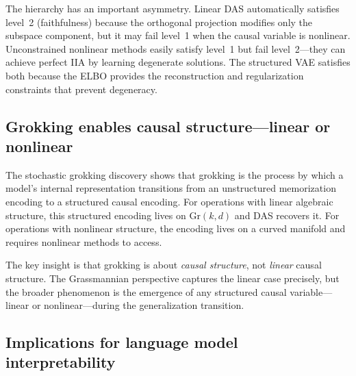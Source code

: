 \documentclass{article}
\newcommand{\Gr}{\mathrm{Gr}}
\begin{document}
The hierarchy has an important asymmetry. Linear DAS automatically satisfies
level~2 (faithfulness) because the orthogonal projection modifies only the
subspace component, but it may fail level~1 when the causal variable is
nonlinear. Unconstrained nonlinear methods easily satisfy level~1 but fail
level~2---they can achieve perfect IIA by learning degenerate solutions. The
structured VAE satisfies both because the ELBO provides the reconstruction and
regularization constraints that prevent degeneracy.

\subsection{Grokking enables causal structure---linear or nonlinear}

The stochastic grokking discovery shows that grokking is the process by which a
model's internal representation transitions from an unstructured memorization
encoding to a structured causal encoding. For operations with linear algebraic
structure, this structured encoding lives on $\Gr(k,d)$ and DAS recovers it.
For operations with nonlinear structure, the encoding lives on a curved manifold
and requires nonlinear methods to access.

The key insight is that grokking is about \emph{causal structure}, not
\emph{linear} causal structure. The Grassmannian perspective captures the linear
case precisely, but the broader phenomenon is the emergence of any structured
causal variable---linear or nonlinear---during the generalization transition.

\subsection{Implications for language model interpretability}
\end{document}

